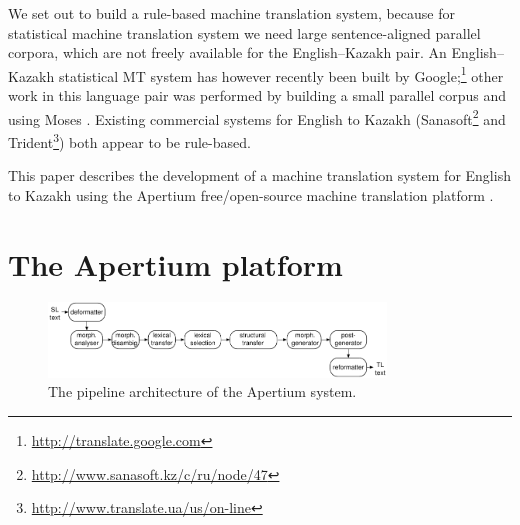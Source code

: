 \documentclass[11pt]{article}
\begin{document}
We set out to build a rule-based machine translation system, because for statistical machine translation 
system we need large sentence-aligned parallel corpora, which are not freely available
for the English--Kazakh pair. An English--Kazakh statistical MT system has however recently been built by Google;\footnote{\url{http://translate.google.com}}
other work in this language pair was performed by building a small parallel corpus and using Moses \citep{assylbekov14}. Existing 
commercial systems for English to Kazakh (Sanasoft\footnote{\url{http://www.sanasoft.kz/c/ru/node/47}} 
and Trident\footnote{\url{http://www.translate.ua/us/on-line}}) both appear to be rule-based. 

This paper describes the development of a machine translation system 
for English to Kazakh using the Apertium free/open-source machine 
translation platform \citep{forcada11}. %

\section{The Apertium platform}

\begin{figure}[htbp]
\begin{center}
 \includegraphics[width=0.8\textwidth]{architecture.pdf}
\end{center}
\caption{The pipeline architecture of the Apertium system.}
\label{figure:pipeline}
\vspace{-1em}
\end{figure}
\end{document}

